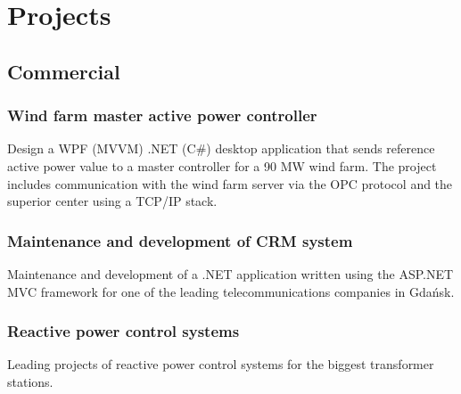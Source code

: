 \documentclass[letterpaper]{template/twentysecondcv_en} %
\begin{document}
\begin{twenty} %
\end{twenty}

\vspace{-0.25cm}
\section{Projects}
\subsection{Commercial}
\vspace{-0.25cm}


\subsubsection*{Wind farm master active power controller}
Design a WPF (MVVM) .NET (C\#) desktop application that sends reference active power value to a master controller for a 90 MW wind farm. The project includes communication with the wind farm server via the OPC protocol and the superior center using a TCP/IP stack.

\subsubsection*{Maintenance and development of CRM system}
Maintenance and development of a .NET application written using the ASP.NET MVC framework for one of the leading telecommunications companies in Gdańsk. 

\subsubsection*{Reactive power control systems}
Leading projects of reactive power control systems for the biggest transformer stations.
\end{document}
